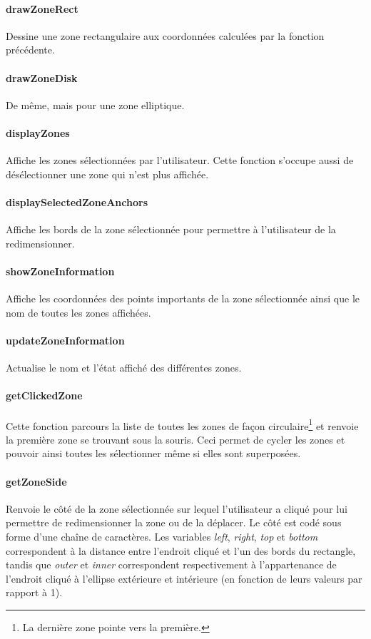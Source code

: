 \documentclass[a4paper]{article}
\begin{document}
\paragraph{drawZoneRect} Dessine une zone rectangulaire aux coordonnées calculées par la fonction précédente.
\paragraph{drawZoneDisk} De même, mais pour une zone elliptique.
\paragraph{displayZones} Affiche les zones sélectionnées par l'utilisateur. Cette fonction s'occupe aussi de désélectionner une zone qui n'est plus affichée.
\paragraph{displaySelectedZoneAnchors} Affiche les bords de la zone sélectionnée pour permettre à l'utilisateur de la redimensionner.
\paragraph{showZoneInformation} Affiche les coordonnées des points importants de la zone sélectionnée ainsi que le nom de toutes les zones affichées.
\paragraph{updateZoneInformation} Actualise le nom et l'état affiché des différentes zones.
\paragraph{getClickedZone} Cette fonction parcours la liste de toutes les zones de façon circulaire\footnote{La dernière zone pointe vers la première.} et renvoie la première zone se trouvant sous la souris. Ceci permet de cycler les zones et pouvoir ainsi toutes les sélectionner même si elles sont superposées.
\paragraph{getZoneSide} Renvoie le côté de la zone sélectionnée sur lequel l'utilisateur a cliqué pour lui permettre de redimensionner la zone ou de la déplacer. Le côté est codé sous forme d'une chaîne de caractères. Les variables \textit{left}, \textit{right}, \textit{top} et \textit{bottom} correspondent à la distance entre l'endroit cliqué et l'un des bords du rectangle, tandis que \textit{outer} et \textit{inner} correspondent respectivement à l'appartenance de l'endroit cliqué à l'ellipse extérieure et intérieure (en fonction de leurs valeurs par rapport à 1).
\end{document}
